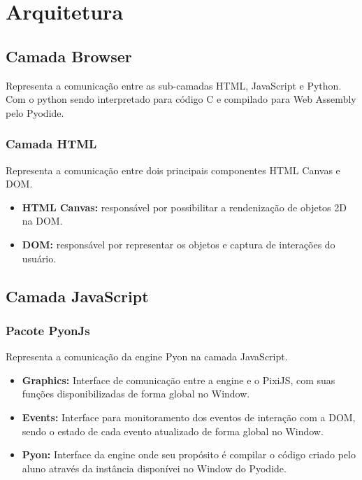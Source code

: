 \section{Arquitetura}

\subsection{Camada Browser}

Representa a comunicação entre as sub-camadas HTML, JavaScript e Python. Com o python sendo interpretado para código C e compilado para Web Assembly pelo Pyodide.

\subsubsection{Camada HTML}

Representa a comunicação entre dois principais componentes HTML Canvas e DOM. 

\begin{itemize}
    \item \textbf{HTML Canvas:} responsável por possibilitar a rendenização de objetos 2D na DOM. 
    \item \textbf{DOM:} responsável por representar os objetos e captura de interações do usuário.
\end{itemize}

\subsection{Camada JavaScript}

\subsubsection{Pacote PyonJs}

Representa a comunicação da engine Pyon na camada JavaScript.

\begin{itemize}
    \item \textbf{Graphics:} Interface de comunicação entre a engine e o PixiJS, com suas funções disponibilizadas de forma global no Window.
    \item \textbf{Events:} Interface para monitoramento dos eventos de interação com a DOM, sendo o estado de cada evento atualizado de forma global no Window.
    \item \textbf{Pyon:} Interface da engine onde seu propósito é compilar o código criado pelo aluno através da instância disponívei no Window do Pyodide.
\end{itemize}

